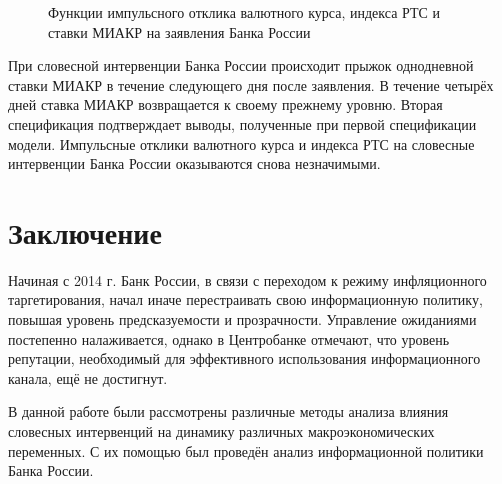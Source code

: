 \documentclass[12pt,a4paper, oneside]{extreport}
\begin{document}
\begin{figure}[h]
\begin{minipage}[H]{0.49\linewidth}
\end{minipage}
\caption{Функции импульсного отклика валютного курса, индекса РТС и ставки МИАКР на заявления Банка России}
\label{otkl_1}
\end{figure}

При словесной интервенции Банка России происходит прыжок однодневной ставки МИАКР в течение следующего дня после заявления. В течение четырёх дней ставка МИАКР возвращается к своему прежнему уровню. Вторая спецификация подтверждает выводы, полученные при первой спецификации модели. Импульсные отклики валютного курса и индекса РТС на словесные интервенции Банка России оказываются снова незначимыми.



\chapter*{Заключение}

Начиная с 2014 г. Банк России, в связи с переходом к режиму инфляционного таргетирования, начал иначе перестраивать свою информационную политику, повышая уровень предсказуемости и прозрачности. Управление ожиданиями постепенно налаживается, однако в Центробанке отмечают, что уровень репутации, необходимый для эффективного использования информационного канала, ещё не достигнут.

В данной работе были рассмотрены различные методы анализа влияния словесных интервенций на динамику различных макроэкономических переменных. С их помощью был проведён анализ информационной политики Банка России.
\end{document}
